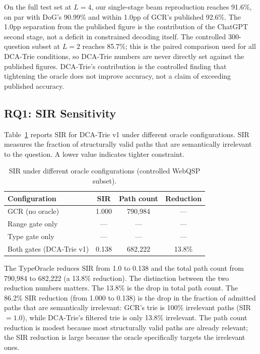 On the full test set at $L{=}4$, our single-stage beam reproduction reaches 91.6\%,
on par with DoG's 90.99\% and within 1.0pp of GCR's published 92.6\%. The 1.0pp
separation from the published figure is the contribution of the ChatGPT second stage,
not a deficit in constrained decoding itself. The controlled 300-question subset at
$L{=}2$ reaches 85.7\%; this is the paired comparison used for all DCA-Trie
conditions, so DCA-Trie numbers are never directly set against the published figures.
DCA-Trie's contribution is the controlled finding that tightening the oracle does not
improve accuracy, not a claim of exceeding published accuracy.

\subsection{RQ1: SIR Sensitivity}
\label{sec:rq1}

Table~\ref{tab:rq1} reports SIR for DCA-Trie v1 under different oracle configurations.
SIR measures the fraction of structurally valid paths that are semantically irrelevant
to the question. A lower value indicates tighter constraint.

\begin{table}[htpb]
  \centering
  \caption{SIR under different oracle configurations (controlled WebQSP subset).}
  \label{tab:rq1}
  \begin{tabular}{@{}lccc@{}}
    \toprule
    Configuration            & SIR   & Path count & Reduction \\
    \midrule
    GCR (no oracle)          & 1.000 & 790,984    & ---       \\
    Range gate only          & ---   & ---        & ---       \\
    Type gate only           & ---   & ---        & ---       \\
    Both gates (DCA-Trie v1) & 0.138 & 682,222    & 13.8\%    \\
    \bottomrule
  \end{tabular}
\end{table}

The TypeOracle reduces SIR from 1.0 to 0.138 and the total path count from 790{,}984
to 682{,}222 (a 13.8\% reduction). The distinction between the two reduction numbers
matters. The 13.8\% is the drop in total path count. The 86.2\% SIR reduction (from
1.000 to 0.138) is the drop in the fraction of admitted paths that are semantically
irrelevant: GCR's trie is 100\% irrelevant paths (SIR $= 1.0$), while DCA-Trie's
filtered trie is only 13.8\% irrelevant. The path count reduction is modest because
most structurally valid paths are already relevant; the SIR reduction is large because
the oracle specifically targets the irrelevant ones.

